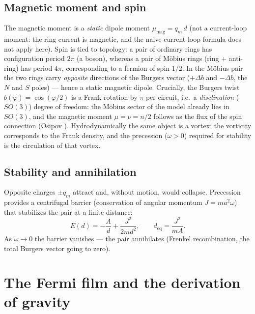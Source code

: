 \documentclass[12pt,a4paper]{article}
\begin{document}
\subsection{Magnetic moment and spin}
The magnetic moment is a \emph{static} dipole moment $\mu_{\text{mag}}=q_m\,d$
(not a current-loop moment: the ring current is magnetic, and the naive
current-loop formula does not apply here). Spin is tied to topology: a pair of
ordinary rings has configuration period $2\pi$ (a boson), whereas a pair of
M\"obius rings (ring + anti-ring) has period $4\pi$, corresponding to a fermion
of spin $1/2$. In the M\"obius pair the two rings carry \emph{opposite}
directions of the Burgers vector ($+\Delta b$ and $-\Delta b$, the $N$ and $S$
poles) --- hence a static magnetic dipole. Crucially, the Burgers twist
$b(\varphi)=\cos(\varphi/2)$ is a Frank rotation by $\pi$ per circuit, i.e.\ a
\emph{disclination} ($SO(3)$) degree of freedom: the M\"obius sector of the
model already lies in $SO(3)$, and the magnetic moment $\mu=\nu=n/2$ follows as
the flux of the spin connection (Osipov \cite{osipov2010}). Hydrodynamically
the same object is a vortex: the vorticity corresponds to the Frank density,
and the precession ($\omega>0$) required for stability is the circulation of
that vortex.

\subsection{Stability and annihilation}
Opposite charges $\pm q_m$ attract and, without motion, would collapse.
Precession provides a centrifugal barrier (conservation of angular momentum
$J=m a^2\omega$) that stabilizes the pair at a finite distance:
\begin{equation}
E(d) = -\frac{A}{d} + \frac{J^2}{2 m d^2},\qquad d_{\text{eq}}=\frac{J^2}{mA}.
\end{equation}
As $\omega\to0$ the barrier vanishes --- the pair annihilates (Frenkel
recombination, the total Burgers vector going to zero).

\section{The Fermi film and the derivation of gravity}
\label{sec:fermi}
\end{document}
